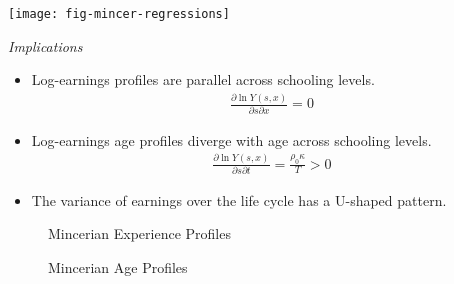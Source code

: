 \begin{frame}[plain]

\begin{center}
\texttt{[image: fig-mincer-regressions]}
\end{center}

\end{frame}

\begin{frame}\begin{center}
\LARGE\textit{Implications}
\end{center}\end{frame}



\begin{frame}
\begin{itemize}
\item Log-earnings profiles are parallel across schooling levels.
\begin{align*}
\frac{\partial \ln Y(s, x)}{\partial s \partial x} = 0
\end{align*}
\item Log-earnings age profiles diverge with age across schooling levels.
\begin{align*}
\frac{\partial \ln Y(s, x)}{\partial s \partial t} = \frac{\rho_0\kappa}{T} > 0
\end{align*}
\item The variance of earnings over the life cycle has a U-shaped pattern.
\end{itemize}
\end{frame}


\begin{frame}
\begin{figure}[htp]\centering
\caption{Mincerian Experience Profiles}\label{Mincerian Experience Profiles}
\end{figure}
\end{frame}

\begin{frame}
\begin{figure}[htp]\centering
\caption{Mincerian Age Profiles}\label{Mincerian Age Profiles}
\end{figure}
\end{frame}


